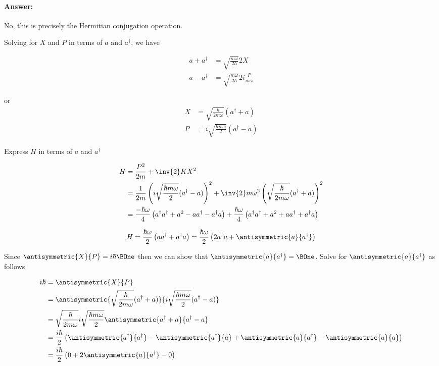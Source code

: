 \paragraph{Answer:} No, this is precisely the Hermitian conjugation operation.

Solving for $X$ and $P$ in terms of $a$ and $a^\dagger$, we have

\begin{align*}
a + a^\dagger &= \sqrt{\frac{m \omega}{2 \hbar}} 2 X  \\
a - a^\dagger &= \sqrt{\frac{m \omega}{2 \hbar}} 2 i \frac{P }{m \omega}
\end{align*}

or
\begin{align}\label{eqn:PHY356FLecture11:30}
X &= \sqrt{\frac{\hbar}{2 m \omega}} (a^\dagger + a) \\
P &= i \sqrt{\frac{\hbar m \omega}{2}} (a^\dagger -a)
\end{align}

Express $H$ in terms of $a$ and $a^\dagger$

\begin{align*}
H
&= \frac{P^2}{2m} + \inv{2} K X^2  \\
&=
\frac{1}{2m} \left(
i \sqrt{\frac{\hbar m \omega}{2}} (a^\dagger -a)
\right)^2
+ \inv{2} m \omega^2
\left(
\sqrt{\frac{\hbar}{2 m \omega}} (a^\dagger + a)
\right)^2 \\
&=
\frac{-\hbar \omega}{4} \left(
a^\dagger a^\dagger + a^2 - a a^\dagger - a^\dagger a
\right)
+ \frac{\hbar \omega}{4}
\left(
a^\dagger a^\dagger + a^2 + a a^\dagger + a^\dagger a
\right) \\
\end{align*}

\begin{equation}\label{eqn:PHY356FLecture11:66}
H
=
\frac{\hbar \omega}{2} \left(
a a^\dagger + a^\dagger a
\right)
=
\frac{\hbar \omega}{2} \left(
2 a^\dagger a + \antisymmetric{a}{a^\dagger}
\right)
\end{equation}

Since $\antisymmetric{X}{P} = i \hbar \BOne$ then we can show that $\antisymmetric{a}{a^\dagger} = \BOne$.  Solve for $\antisymmetric{a}{a^\dagger}$ as follows

\begin{align*}
i \hbar
&=
\antisymmetric{X}{P} \\
&=
\antisymmetric{\sqrt{\frac{\hbar}{2 m \omega}} (a^\dagger + a) }{i \sqrt{\frac{\hbar m \omega}{2}} (a^\dagger -a)} \\
&=
\sqrt{\frac{\hbar}{2 m \omega}} i \sqrt{\frac{\hbar m \omega}{2}}
\antisymmetric{a^\dagger + a}{a^\dagger -a} \\
&= \frac{i \hbar}{2}
\left(
\antisymmetric{a^\dagger}{a^\dagger}
-\antisymmetric{a^\dagger}{a}
+\antisymmetric{a}{a^\dagger}
-\antisymmetric{a}{a} \right)  \\
&= \frac{i \hbar}{2}
\left(
0
+2 \antisymmetric{a}{a^\dagger}
-0
\right)
\end{align*}

